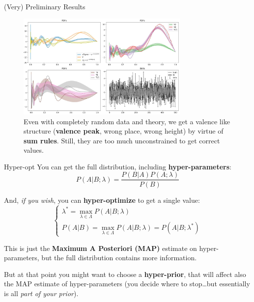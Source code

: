 \documentclass[9pt]{beamer}
\begin{document}
\begin{frame}{(Very) Preliminary Results}
    \vspace*{10pt}
    \begin{figure}
        \centering
        \includegraphics[width=0.75\textwidth]{fit-pdf}
        \caption{
            Even with completely random data and theory, we get a valence like
            structure (\textbf{valence peak}, wrong place, wrong height) by
            virtue of \textbf{sum rules}. Still, they are too much
            unconstrained to get correct values.
        }
    \end{figure}
\end{frame}

\begin{frame}{Hyper-opt}
    You can get the full distribution, including \textbf{hyper-parameters}:
    \begin{equation*}
        P(A|B;\lambda) = \frac{P(B|A) P(A;\lambda)}{P(B)}
    \end{equation*}

    And, \textit{if you wish}, you can \alert{\textbf{hyper-optimize}} to get a
    single value:
    \begin{equation*}
        \begin{cases}
            \lambda^* = \max_{\lambda \in \Lambda} P(A|B;\lambda)\\
            P(A|B) = \max_{\lambda \in \Lambda} P(A|B;\lambda) = P(A|B; \lambda^*)
        \end{cases}
    \end{equation*}
    
    This is just the \textbf{Maximum A Posteriori (MAP)} estimate on
    hyper-parameters, but the full distribution contains more information.

    But at that point you might want to choose a \textbf{hyper-prior}, that
    will affect also the MAP estimate of hyper-parameters (you decide where to
    stop\dots but essentially is all \textit{part of your prior}).
\end{frame}
\end{document}
